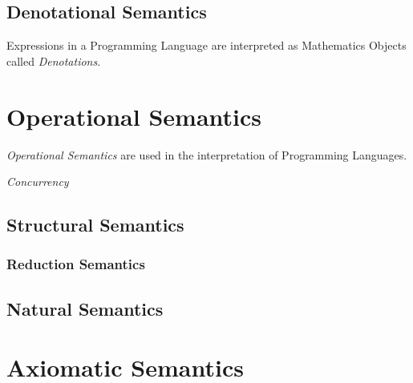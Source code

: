 \subsection{Denotational Semantics}

Expressions in a Programming Language are interpreted as Mathematics
Objects called \emph{Denotations}.



\section{Operational Semantics}

\emph{Operational Semantics} are used in the interpretation of
Programming Languages.

\emph{Concurrency}

\subsection{Structural Semantics}

\subsubsection{Reduction Semantics}

\subsection{Natural Semantics}



\section{Axiomatic Semantics}

